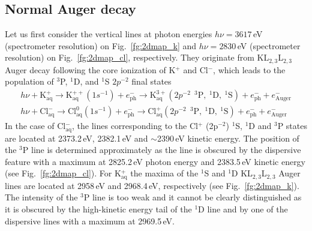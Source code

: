 \subsection{Normal Auger decay}\label{ssec:na}

Let us first consider the vertical lines at photon energies $h\nu = 3617$\,eV {\color{red}(spectrometer resolution)} on Fig.\ \ref{fg:2dmap_k} and $h\nu = 2830$\,eV {\color{red}(spectrometer resolution)} on Fig.\ \ref{fg:2dmap_cl}, respectively. They originate from KL$_{2,3}$L$_{2,3}$ Auger decay following the core ionization of K$^+$ and Cl$^-$, which leads to the population of $^3$P, $^1$D, and $^1$S $2p^{-2}$ final states
%
\begin{align*}
h\nu + \text{K}_\text{aq}^{+} \rightarrow \text{K}_\text{aq}^{++}(1s^{-1}) + e^{-}_{\text{ph}}
			 \rightarrow \text{K}_\text{aq}^{3+} (2p^{-2}\ \ ^3\text{P},\ ^1\text{D},\ ^1\text{S}) + e^{-}_{\text{ph}} + e^{-}_{\text{Auger}} \\
h\nu + \text{Cl}_\text{aq}^{-} \rightarrow \text{Cl}_\text{aq}^{0}(1s^{-1}) + e^{-}_{\text{ph}}
			 \rightarrow \text{Cl}_\text{aq}^{+} (2p^{-2}\ \ ^3\text{P},\ ^1\text{D},\ ^1\text{S}) + e^{-}_{\text{ph}} + e^{-}_{\text{Auger}} 
\end{align*}
%
In the case of Cl$^{-}_{\text{aq}}$, the lines corresponding to the Cl$^{+}$ (2p$^{-2}$) $^1$S, $^1$D and $^3$P states are located at 2373.2\,eV, 2382.1\,eV and $\sim$2390\,eV kinetic energy. The position of the $^{3}$P line is determined approximately as the line is obscured by the dispersive feature with a maximum at 2825.2\,eV photon energy and 2383.5\,eV kinetic energy (see Fig.\ \ref{fg:2dmap_cl}). For K$^{+}_{\text{aq}}$ the maxima of the $^1$S and $^1$D KL$_{2,3}$L$_{2,3}$ Auger lines are located at 2958\,eV and 2968.4\,eV, respectively (see Fig.\ \ref{fg:2dmap_k}). The intensity of the $^3$P line is too weak and it cannot be clearly distinguished as it is obscured by the high-kinetic energy tail of the $^1$D line and by one of the dispersive lines with a maximum at 2969.5\,eV.


